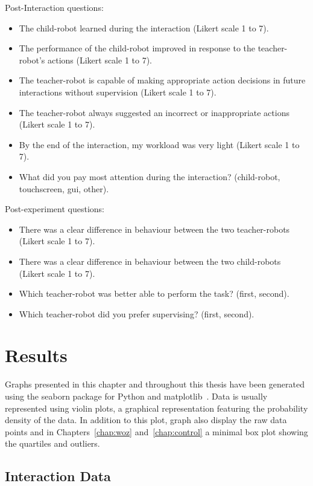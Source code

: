 Post-Interaction questions:
\begin{itemize}
	\item The child-robot learned during the interaction (Likert scale 1 to 7).
	\item The performance of the child-robot improved in response to the teacher-robot's actions (Likert scale 1 to 7).
	\item The teacher-robot is capable of making appropriate action decisions in future interactions without supervision (Likert scale 1 to 7).
	\item The teacher-robot always suggested an incorrect or inappropriate actions (Likert scale 1 to 7).
	\item By the end of the interaction, my workload was very light (Likert scale 1 to 7).
	\item What did you pay most attention during the interaction? (child-robot, touchscreen, \gls{gui}, other).
\end{itemize}

Post-experiment questions:
\begin{itemize}
	\item There was a clear difference in behaviour between the two teacher-robots (Likert scale 1 to 7).
	\item There was a clear difference in behaviour between the two child-robots (Likert scale 1 to 7).
	\item Which teacher-robot was better able to perform the task? (first, second).
	\item Which teacher-robot did you prefer supervising? (first, second).
\end{itemize} 

\section{Results}

Graphs presented in this chapter and throughout this thesis have been generated using the seaborn package for Python and matplotlib~\citep{waskom2017seaborn}. Data is usually represented using violin plots, a graphical representation featuring the probability density of the data. In addition to this plot, graph also display the raw data points and in Chapters~\ref{chap:woz} and~\ref{chap:control} a minimal box plot showing the quartiles and outliers.

\subsection{Interaction Data}


